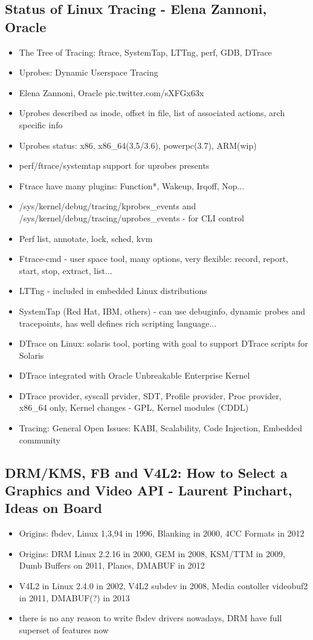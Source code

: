 \documentclass[10pt]{article}
\begin{document}
{\subsection{Status of Linux Tracing - Elena Zannoni, Oracle}
\begin{itemize}
\item The Tree of Tracing: ftrace, SystemTap, LTTng, perf, GDB, DTrace
\item Uprobes: Dynamic Userspace Tracing
\item Elena Zannoni, Oracle pic.twitter.com/sXFGx63x
\item Uprobes described as inode, offset in file, list of associated actions, arch specific info
\item Uprobes status: x86, x86\_64(3,5/3.6), powerpc(3.7), ARM(wip)
\item perf/ftrace/systemtap support for uprobes presents
\item Ftrace have many plugins: Function*, Wakeup, Irqoff, Nop...
\item /sys/kernel/debug/tracing/kprobes\_events and /sys/kernel/debug/tracing/uprobes\_events - for CLI control
\item Perf list, annotate, lock, sched, kvm
\item Ftrace-cmd - user space tool, many options, very flexible: record, report, start, stop, extract, list...
\item LTTng - included in embedded Linux distributions
\item SystemTap (Red Hat, IBM, others) - can use debuginfo, dynamic probes and tracepoints, has well defines rich scripting language...
\item DTrace on Linux: solaris tool, porting with goal to support DTrace scripts for Solaris
\item DTrace integrated with Oracle Unbreakable Enterprise Kernel
\item DTrace provider, syscall prvider, SDT, Profile provider, Proc provider, x86\_64 only, Kernel changes - GPL, Kernel modules (CDDL)
\item Tracing: General Open Issues: KABI, Scalability, Code Injection, Embedded community
\end{itemize}

\subsection{DRM/KMS, FB and V4L2: How to Select a Graphics and Video API - Laurent Pinchart, Ideas on Board}
\begin{itemize}
\item Origins: fbdev, Linux 1,3,94 in 1996, Blanking in 2000, 4CC Formats in 2012
\item Origins: DRM Linux 2.2.16 in 2000, GEM in 2008, KSM/TTM in 2009, Dumb Buffers on 2011, Planes, DMABUF in 2012
\item V4L2 in Linux 2.4.0 in 2002, V4L2 subdev in 2008, Media contoller videobuf2 in 2011, DMABUF(?) in 2013
\item there is no any reason to write fbdev drivers nowadays, DRM have full superset of features now
\end{itemize}

}
\end{document}
